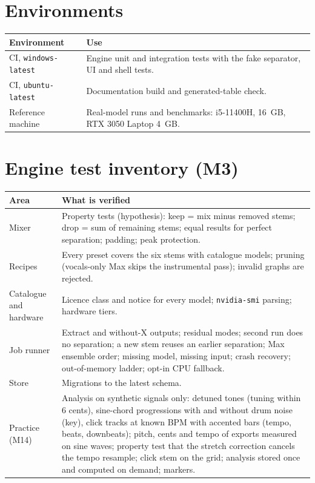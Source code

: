 \documentclass{covermaker}
\begin{document}
\chapter{Environments}
\begin{tabularx}{\linewidth}{@{}lY@{}}
\toprule
\textbf{Environment} & \textbf{Use} \\
\midrule
CI, \texttt{windows-latest} & Engine unit and integration tests with the fake separator, UI and shell tests. \\
CI, \texttt{ubuntu-latest} & Documentation build and generated-table check. \\
Reference machine & Real-model runs and benchmarks: i5-11400H, 16~GB, RTX 3050 Laptop 4~GB. \\
\bottomrule
\end{tabularx}

\chapter{Engine test inventory (M3)}
\begin{tabularx}{\linewidth}{@{}lY@{}}
\toprule
\textbf{Area} & \textbf{What is verified} \\
\midrule
Mixer & Property tests (hypothesis): keep = mix minus removed stems; drop = sum of
remaining stems; equal results for perfect separation; padding; peak protection. \\
Recipes & Every preset covers the six stems with catalogue models; pruning
(vocals-only Max skips the instrumental pass); invalid graphs are rejected. \\
Catalogue and hardware & Licence class and notice for every model;
\texttt{nvidia-smi} parsing; hardware tiers. \\
Job runner & Extract and without-X outputs; residual modes; second run does no
separation; a new stem reuses an earlier separation; Max ensemble order; missing
model, missing input; crash recovery; out-of-memory ladder; opt-in CPU fallback. \\
Store & Migrations to the latest schema. \\
Practice (M14) & Analysis on synthetic signals only: detuned tones (tuning
within 6 cents), sine-chord progressions with and without drum noise (key),
click tracks at known BPM with accented bars (tempo, beats, downbeats);
pitch, cents and tempo of exports measured on sine waves; property test that
the stretch correction cancels the tempo resample; click stem on the grid;
analysis stored once and computed on demand; markers. \\
\bottomrule
\end{tabularx}
\end{document}
